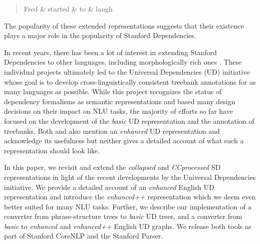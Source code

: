 \documentclass[10pt, a4paper]{article}
\begin{document}
\begin{quote}
\begin{center}
\begin{dependency}[column sep=0.2em, edge unit distance=2.25ex]
  \begin{deptext}
    Fred \& started \& to \& laugh \\
  \end{deptext}
\end{dependency}
\end{center}
\end{quote}

The popularity of these extended representations suggests 
that their existence plays a major role in the popularity of Stanford 
Dependencies. 

In recent years, there has been a lot of interest in extending Stanford Dependencies
 to other languages, including morphologically rich ones \cite{mcdonald2013universal,tsarfaty2013unified,demarneffe2014universal}.
These individual projects ultimately led to the Universal Dependencies (UD) initiative \cite{nivre2016universal} whose goal is to develop 
cross-linguistically consistent treebank annotations for as many languages as possible. 
While this project recognizes the status of dependency formalisms as semantic representations
and based many design decisions on their impact on NLU tasks, 
the majority of efforts so far have focused on the development of the \textit{basic} UD representation and 
the annotation of treebanks. Both  and  also mention an \textit{enhanced} 
UD representation and acknowledge its usefulness 
but neither gives a detailed account of what such a representation should look like.

In this paper, we revisit and extend the \textit{collapsed} and \textit{CCprocessed} SD representations in light of the recent developments 
by the Universal Dependencies initiative. We provide a detailed account of an \textit{enhanced} English UD representation and introduce 
the \textit{enhanced++} representation which we deem even better suited for many NLU tasks. Further, we describe 
our implementation of a converter from phrase-structure trees to \textit{basic} UD trees, 
and a converter from \textit{basic} to \textit{enhanced} and \textit{enhanced++} English UD graphs. 
We release both tools as part of Stanford CoreNLP and the Stanford Parser.
\end{document}
